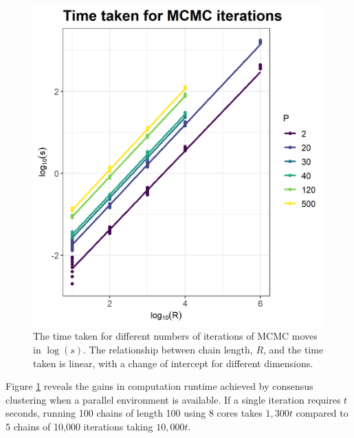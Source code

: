 \documentclass{bioinfo}
\begin{document}
\begin{figure} %
	\centering
	\includegraphics[scale=0.5]{./Images/Simulations/TimeComparison.png}	
	\caption{The time taken for different numbers of iterations of MCMC moves in $\log(s)$. The relationship between chain length, $R$, and the time taken is linear, with a change of intercept for different dimensions.}
	\label{fig:timeMCMC}
\end{figure}

Figure \ref{fig:timeMCMC} reveals the gains in computation runtime achieved by consensus clustering when a parallel environment is available. If a single iteration requires $t$ seconds, running 100 chains of length 100 using 8 cores takes $1,300t$ compared to 5 chains of 10,000 iterations taking $10,000t$. 

\end{document}
